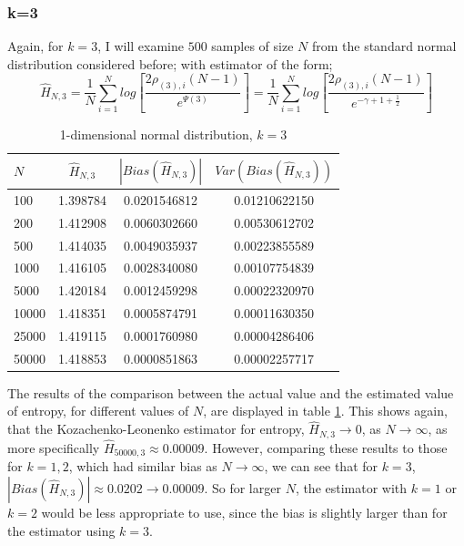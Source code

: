 \documentclass{article}
\begin{document}
\subsubsection{k=3} \label{N_k=3}
Again, for $k=3$, I will examine $500$ samples of size $N$ from the standard normal distribution considered before; with estimator of the form;
\begin{equation}
\hat{H}_{N, 3} = \frac{1}{N} \sum_{i=1}^{N} log \left[ \frac{2\rho_{(3),i} (N-1)}{e^{\Psi(3)}} \right] = \frac{1}{N} \sum_{i=1}^{N} log \left[ \frac{2\rho_{(3),i} (N-1)}{e^{-\gamma + 1 + \frac{1}{2}}} \right] \nonumber
\end{equation}

\begin{table}
\caption{1-dimensional normal distribution, $k=3$} \label{normal_k=3_table}
\begin{center}
\begin{tabular}{| l | c c c|} 
\toprule
$N$ & $\hat{H}_{N, 3}$ & $|Bias(\hat{H}_{N, 3})|$ & $Var(Bias(\hat{H}_{N, 3}))$ \\
\midrule[1pt]
100     & 1.398784     & 0.0201546812     & 0.01210622150  \\
200     & 1.412908     & 0.0060302660     & 0.00530612702  \\
500     & 1.414035     & 0.0049035937     & 0.00223855589  \\
1000    & 1.416105     & 0.0028340080     & 0.00107754839  \\
5000    & 1.420184     & 0.0012459298     & 0.00022320970  \\
10000   & 1.418351     & 0.0005874791     & 0.00011630350  \\
25000   & 1.419115     & 0.0001760980     & 0.00004286406  \\
50000   & 1.418853     & 0.0000851863     & 0.00002257717  \\
\hline
\end{tabular}
\end{center}
\end{table}

The results of the comparison between the actual value and the estimated value of entropy, for different values of $N$, are displayed in table \ref{normal_k=3_table}. This shows again, that the Kozachenko-Leonenko estimator for entropy, $\hat{H}_{N, 3} \to 0$, as $N \to \infty$, as more specifically $\hat{H}_{50000, 3} \approx 0.00009$. However, comparing these results to those for $k=1, 2$, which had similar bias as $N \to \infty$, we can see that for $k=3$, $|Bias(\hat{H}_{N, 3})| \approx 0.0202 \to 0.00009$. So for larger $N$, the estimator with $k=1$ or $k=2$ would be less appropriate to use, since the bias is slightly larger than for the estimator using $k=3$.
\end{document}

